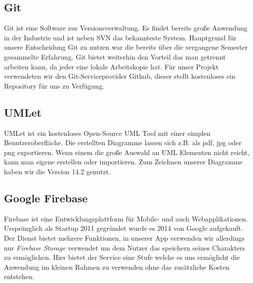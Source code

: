 \subsection{Git}

Git ist eine Software zur Versionsverwaltung. Es findet bereits große Anwendung in der Industrie und ist neben SVN das bekannteste System. Hauptgrund für unsere Entscheidung Git zu nutzen war die bereits über die vergangene Semester gesammelte Erfahrung. Git bietet weiterhin den Vorteil das man getrennt arbeiten kann, da jeder eine lokale Arbeitskopie hat. Für unser Projekt verwendeten wir den Git-Serviceprovider Github, dieser stellt kostenloses ein Repository für uns zu Verfügung.

\subsection{UMLet}

UMLet ist ein kostenloses Open-Source UML Tool mit einer simplen Benutzeroberfläche. Die erstellten Diagramme lassen sich z.B. als pdf, jpg oder png exportieren. Wenn einem die große Auswahl an UML Elementen nicht reicht, kann man eigene erstellen oder importieren. Zum Zeichnen unserer Diagramme haben wir die Version 14.2 genutzt. %

\subsection{Google Firebase}
\label{sdt:firebase}

Firebase ist eine Entwicklungsplattform für Mobile- und auch Webapplikationen. Ursprünglich als Startup 2011 gegründet wurde es 2014 von Google aufgekauft. Der Dienst bietet mehrere Funktionen, in unserer App verwenden wir allerdings nur \textit{Firebase Storage} verwendet um dem Nutzer das speichern seines Charakters zu ermöglichen. Hier bietet der Service eine Stufe welche es uns ermöglicht die Anwendung im kleinen Rahmen zu verwenden ohne das zusätzliche Kosten entstehen.

\newpage
